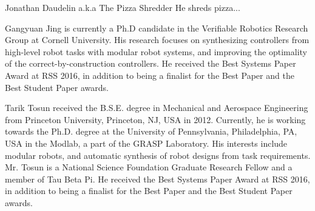 \documentclass[journal]{IEEEtran}
\begin{document}





\begin{IEEEbiography}
    {Jonathan Daudelin a.k.a The Pizza Shredder}
He shreds pizza...
\end{IEEEbiography}

\begin{IEEEbiographynophoto}{Gangyuan Jing}
is currently a Ph.D candidate in the Verifiable Robotics Research Group at Cornell University. His research focuses on synthesizing controllers from high-level robot tasks with modular robot systems, and improving the optimality of the correct-by-construction controllers. He received the Best Systems Paper Award at RSS 2016, in addition to being a finalist for the Best Paper and the Best Student Paper awards.
\end{IEEEbiographynophoto}


\begin{IEEEbiographynophoto}{Tarik Tosun}
received the B.S.E. degree in Mechanical and Aerospace Engineering from Princeton University, Princeton, NJ, USA in 2012. Currently, he is working towards the Ph.D. degree at the University of Pennsylvania, Philadelphia, PA, USA in the Modlab, a part of the GRASP Laboratory. His interests include modular robots, and automatic synthesis of robot designs from task requirements. Mr. Tosun is a National Science Foundation Graduate Research Fellow and a member of Tau Beta Pi. He received the Best Systems Paper Award at RSS 2016, in addition to being a finalist for the Best Paper and the Best Student Paper awards.
\end{IEEEbiographynophoto}
\end{document}
